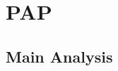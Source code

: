 \documentclass[11pt]{article}
\begin{document}
\newpage
\section{PAP}

\subsection{Main Analysis}
\end{document}
